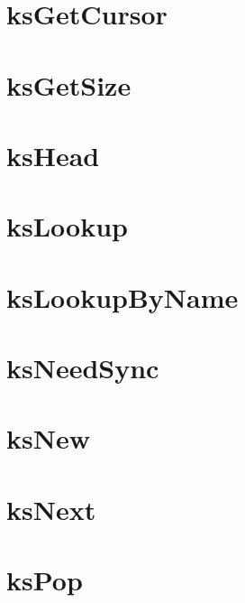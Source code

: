 \documentclass[twoside]{book}
\newcommand{\+}{\discretionary{\mbox{\scriptsize$\hookleftarrow$}}{}{}}
\begin{document}
\chapter{ks\+Get\+Cursor}
\label{doc_api_review_core_ksGetCursor_md}

\chapter{ks\+Get\+Size}
\label{doc_api_review_core_ksGetSize_md}

\chapter{ks\+Head}
\label{doc_api_review_core_ksHead_md}

\chapter{ks\+Lookup}
\label{doc_api_review_core_ksLookup_md}

\chapter{ks\+Lookup\+By\+Name}
\label{doc_api_review_core_ksLookupByName_md}

\chapter{ks\+Need\+Sync}
\label{doc_api_review_core_ksNeedSync_md}

\chapter{ks\+New}
\label{doc_api_review_core_ksNew_md}

\chapter{ks\+Next}
\label{doc_api_review_core_ksNext_md}

\chapter{ks\+Pop}
\label{doc_api_review_core_ksPop_md}

\end{document}
